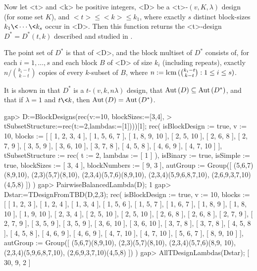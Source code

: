 Now let <t> and <k> be positive integers, <D> be a <t>-$(v,K,\lambda)$
design (for some set $K$), and $<t>\le <k>\le k_1$, where exactly $s$
distinct block-sizes $k_1\< \cdots \< k_s$ occur in <D>. Then this
function returns the <t>-design $D^{*}=D^{*}(t,k)$ described and studied
in \cite{McSo}.

The point set of $D^{*}$ is that of <D>, and the block multiset of $D^{*}$
consists of, for each $i=1,\ldots,s$ and each block $B$ of <D> of size
$k_i$ (including repeats), exactly $n/{k_i-t \choose k-t}$ copies of
every $k$-subset of $B$, where $n:={\rm lcm}\,({k_i-t \choose k-t}:1\le i\le s)$.

It is shown in \cite{McSo} that $D^{*}$ is a $t$-$(v,k,n\lambda)$ design,
that ${\rm Aut}\,(D)\subseteq{\rm Aut}\,(D^{*})$, and that if $\lambda=1$ and $t\<k$,
then ${\rm Aut}\,(D)={\rm Aut}\,(D^{*})$.

\beginexample
gap> D:=BlockDesigns(rec(v:=10, blockSizes:=[3,4],       
>          tSubsetStructure:=rec(t:=2,lambdas:=[1])))[1];
rec( isBlockDesign := true, v := 10, 
  blocks := [ [ 1, 2, 3, 4 ], [ 1, 5, 6, 7 ], [ 1, 8, 9, 10 ], [ 2, 5, 10 ], 
      [ 2, 6, 8 ], [ 2, 7, 9 ], [ 3, 5, 9 ], [ 3, 6, 10 ], [ 3, 7, 8 ], 
      [ 4, 5, 8 ], [ 4, 6, 9 ], [ 4, 7, 10 ] ], 
  tSubsetStructure := rec( t := 2, lambdas := [ 1 ] ), isBinary := true, 
  isSimple := true, blockSizes := [ 3, 4 ], blockNumbers := [ 9, 3 ], 
  autGroup := Group([ (5,6,7)(8,9,10), (2,3)(5,7)(8,10), 
      (2,3,4)(5,7,6)(8,9,10), (2,3,4)(5,9,6,8,7,10), (2,6,9,3,7,10)(4,5,8) ]) 
 )
gap> PairwiseBalancedLambda(D);                          
1
gap> Dstar:=TDesignFromTBD(D,2,3);   
rec( isBlockDesign := true, v := 10, 
  blocks := [ [ 1, 2, 3 ], [ 1, 2, 4 ], [ 1, 3, 4 ], [ 1, 5, 6 ], 
      [ 1, 5, 7 ], [ 1, 6, 7 ], [ 1, 8, 9 ], [ 1, 8, 10 ], [ 1, 9, 10 ], 
      [ 2, 3, 4 ], [ 2, 5, 10 ], [ 2, 5, 10 ], [ 2, 6, 8 ], [ 2, 6, 8 ], 
      [ 2, 7, 9 ], [ 2, 7, 9 ], [ 3, 5, 9 ], [ 3, 5, 9 ], [ 3, 6, 10 ], 
      [ 3, 6, 10 ], [ 3, 7, 8 ], [ 3, 7, 8 ], [ 4, 5, 8 ], [ 4, 5, 8 ], 
      [ 4, 6, 9 ], [ 4, 6, 9 ], [ 4, 7, 10 ], [ 4, 7, 10 ], [ 5, 6, 7 ], 
      [ 8, 9, 10 ] ], 
  autGroup := Group([ (5,6,7)(8,9,10), (2,3)(5,7)(8,10), (2,3,4)(5,7,6)(8,9,
        10), (2,3,4)(5,9,6,8,7,10), (2,6,9,3,7,10)(4,5,8) ]) )
gap> AllTDesignLambdas(Dstar);
[ 30, 9, 2 ]
\endexample
